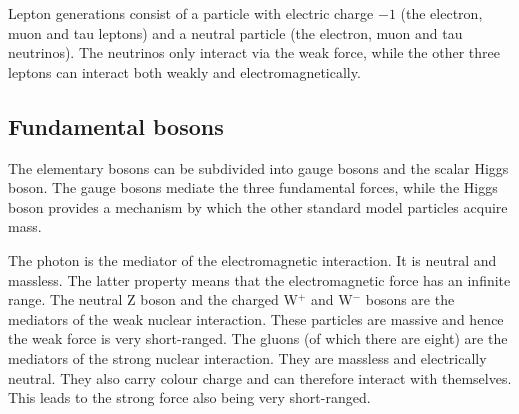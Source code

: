 Lepton generations consist of a particle with electric charge $-1$ (the 
electron, muon and tau leptons) and a neutral particle (the electron, muon and 
tau neutrinos). The neutrinos only interact via the weak force, while the other 
three leptons can interact both weakly and electromagnetically.

\subsection{Fundamental bosons}
The elementary bosons can be subdivided into gauge bosons and the scalar Higgs 
boson. The gauge bosons mediate the three fundamental forces, while the Higgs 
boson provides a mechanism by which the other standard model particles acquire 
mass.

The photon is the mediator of the electromagnetic interaction. It is neutral 
and massless. The latter property means that the electromagnetic force has an 
infinite range. The neutral Z boson and the charged W$^{+}$ and W$^{-}$ bosons 
are the mediators of the weak nuclear interaction. These particles are massive 
and hence the weak force is very short-ranged. The gluons (of which there are 
eight) are the mediators of the strong nuclear interaction. They are massless 
and electrically neutral. They also carry colour charge and can therefore 
interact with themselves. This leads to the strong force also being very 
short-ranged.

